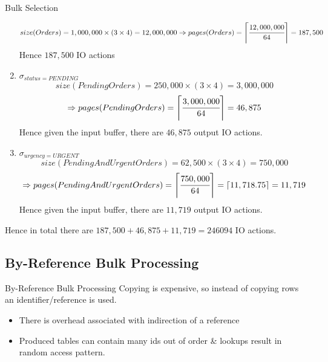 \begin{examplebox}{Bulk Selection}
\begin{enumerate}
{          \[size(Orders) = 1,000,000 \times (3 \times 4) = 12,000,000 \Rightarrow pages(Orders) = \left\lceil \cfrac{12,000,000}{64} \right\rceil = 187,500 \]
          Hence $187,500$ IO actions
          }
    \item { $\sigma_{status=PENDING}$
          \[size(PendingOrders) = 250,000 \times (3 \times 4) = 3,000,000 \]
          \[\Rightarrow pages(PendingOrders) = \left\lceil \cfrac{3,000,000}{64} \right\rceil = 46,875\]
          Hence given the input buffer, there are $46,875$ output IO actions.
          }
    \item { $\sigma_{urgency=URGENT}$
          \[size(PendingAndUrgentOrders) = 62,500 \times (3 \times 4) = 750,000 \]
          \[\Rightarrow pages(PendingAndUrgentOrders) = \left\lceil \cfrac{750,000}{64} \right\rceil = \lceil 11,718.75 \rceil = 11,719\]
          Hence given the input buffer, there are $11,719$ output IO actions.
          }
  \end{enumerate}
  Hence in total there are $187,500 + 46,875 + 11,719 = 246094$ IO actions.
\end{examplebox}

\subsection{By-Reference Bulk Processing}
\begin{definitionbox}{By-Reference Bulk Processing}
  Copying is expensive, so instead of copying rows an identifier/reference is used.
  \begin{itemize}
    \item There is overhead associated with indirection of a reference
    \item Produced tables can contain many ids out of order \& lookups result in random access pattern.
  \end{itemize}
\end{definitionbox}

